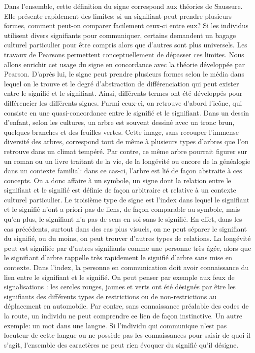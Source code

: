 Dans l'ensemble, cette définition du signe correspond aux théories de Saussure.
Elle présente rapidement des limites: si un signifiant peut prendre plusieurs formes, comment peut-on comparer facilement ceux-ci entre eux? 
Si les individus utilisent divers signifiants pour communiquer, certains demandent un bagage culturel particulier pour être compris alors que d'autres sont plus universels.
Les travaux de Pearsons permettent conceptuellement de dépasser ces limites.
Nous allons enrichir cet usage du signe en concordance avec la théorie développée par Pearson. 
D'après lui, le signe peut prendre plusieurs formes selon le média dans lequel on le trouve et le degré d'abstraction de différenciation qui peut exister entre le signifié et le signifiant. 
Ainsi, différents termes ont été développés pour différencier les différents signes.
Parmi ceux-ci, on retrouve d'abord l'icône, qui consiste en une quasi-concordance entre le signifié et le signifiant. 
Dans un dessin d'enfant, selon les cultures, un arbre est souvent dessiné avec un tronc brun, quelques branches et des feuilles vertes. 
Cette image, sans recouper l'immense diversité des arbres, correspond tout de même à plusieurs types d'arbres que l'on retrouve dans un climat tempéré. 
Par contre, ce même arbre pourrait figurer sur un roman ou un livre traitant de la vie, de la longévité ou encore de la généalogie dans un contexte familial: dans ce cas-ci, l'arbre est lié de façon abstraite à ces concepts. 
On a donc affaire à un symbole, un signe dont la relation entre le signifiant et le signifié est définie de façon arbitraire et relative à un contexte culturel particulier. 
Le troisième type de signe est l'index dans lequel le signifiant et le signifié n'ont a priori pas de liens, de façon comparable au symbole, mais qu'en plus, le signifiant n'a pas de sens en soi sans le signifié. 
En effet, dans les cas précédents, surtout dans des cas plus visuels, on ne peut séparer le signifiant du signifié, ou du moins, on peut trouver d'autres types de relations. 
La longévité peut est signifiée par d'autres signifiants comme une personne très âgée, alors que le signifiant d'arbre rappelle très rapidement le signifié d'arbre sans mise en contexte. 
Dans l'index, la personne en communication doit avoir connaissance du lien entre le signifiant et le signifié. 
On peut penser par exemple aux feux de signalisations : les cercles rouges, jaunes et verts ont été désignés par être les signifiants des différents types de restrictions ou de non-restrictions au déplacement en automobile. 
Par contre, sans connaissance préalable des codes de la route, un individu ne peut comprendre ce lien de façon instinctive. 
Un autre exemple: un mot dans une langue. 
Si l'individu qui communique n'est pas locuteur de cette langue ou ne possède pas les connaissances pour saisir de quoi il s'agit, l'ensemble des caractères ne peut rien évoquer du signifié qu'il désigne.


